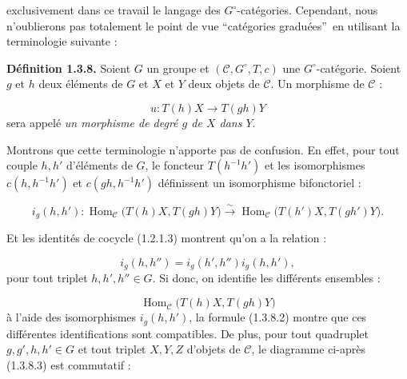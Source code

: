 %
exclusivement dans ce travail le langage des $G^\circ$-catégories.
Cependant, nous n'oublierons pas totalement le point de vue
\textquotedblleft catégories graduées\textquotedblright\ en utilisant
la terminologie suivante :

\noindent\textbf{Définition 1.3.8.}\quad
Soient $G$ un groupe et $(\mathcal C,G^\circ,T,c)$ une
$G^\circ$-catégorie. Soient $g$ et $h$ deux éléments de $G$ et $X$ et
$Y$ deux objets de $\mathcal C$. Un morphisme de $\mathcal C$ :

\[
  u\colon T(h)X\longrightarrow T(gh)Y
\]
sera appelé \emph{un morphisme de degré $g$ de $X$ dans $Y$}.

Montrons que cette terminologie n'apporte pas de confusion. En effet,
pour tout couple $h,h'$ d'éléments de $G$, le foncteur
$T(h^{-1}h')$ et les isomorphismes $c(h,h^{-1}h')$ et
$c(gh,h^{-1}h')$ définissent un isomorphisme bifonctoriel :

\begin{equation}
  i_g(h,h')\colon
  \operatorname{Hom}_{\mathcal C}\bigl(T(h)X,T(gh)Y\bigr)
  \overset{\sim}{\longrightarrow}
  \operatorname{Hom}_{\mathcal C}\bigl(T(h')X,T(gh')Y\bigr).
  \tag{1.3.8.1}
\end{equation}

Et les identités de cocycle (1.2.1.3) montrent qu'on a la relation :

\begin{equation}
  i_g(h,h'')=i_g(h',h'')i_g(h,h'),
  \tag{1.3.8.2}
\end{equation}
pour tout triplet $h,h',h''\in G$. Si donc, on identifie les différents
ensembles :

\[
  \operatorname{Hom}_{\mathcal C}\bigl(T(h)X,T(gh)Y\bigr)
\]
à l'aide des isomorphismes $i_g(h,h')$, la formule (1.3.8.2) montre que
ces différentes identifications sont compatibles. De plus, pour tout
quadruplet $g,g',h,h'\in G$ et tout triplet $X,Y,Z$ d'objets de
$\mathcal C$, le diagramme ci-après (1.3.8.3) est commutatif :

